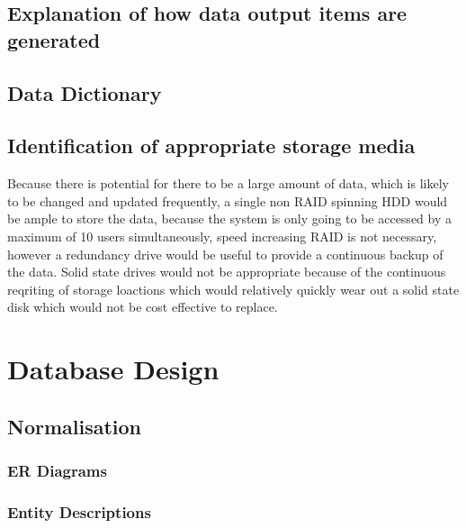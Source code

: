 \subsection{Explanation of how data output items are generated}

\subsection{Data Dictionary}


\subsection{Identification of appropriate storage media}

	Because there is potential for there to be a large amount of data, which is likely to be changed and updated frequently, a single non RAID
	spinning HDD would be ample to store the data, because the system is only going to be accessed by a maximum of 10 users simultaneously, speed
	increasing RAID	is not necessary, however a redundancy drive would be useful to provide a continuous backup of the data. Solid state drives
	would not be appropriate because of the continuous reqriting of storage loactions which  would relatively quickly wear out a solid state disk
	which would not be cost effective to replace.

\section{Database Design}

\subsection{Normalisation}

\subsubsection{ER Diagrams}
	\begin{figure}[H]
	\end{figure}

\subsubsection{Entity Descriptions}

